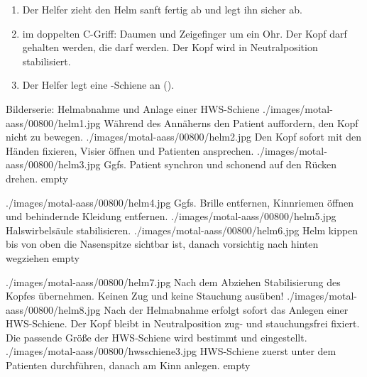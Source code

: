 \begin{ProcedureStepsNoHeading}
{\begin{enumerate}
    {\color{HelferB}Während der Helm abgezogen wird,
    rutscht der  Helfer mit seiner Haltehand
    etwas nach.}
    \item {\color{HelferA}Der  Helfer zieht den
    Helm sanft fertig ab und legt ihn sicher ab.}
    \item {\color{HelferA} im doppelten C-Griff: Daumen und
    Zeigefinger um ein Ohr. Der Kopf darf
     gehalten werden, die 
    darf  werden.
    Der Kopf wird in
    Neutralposition
    stabilisiert. \cite{ITLSde6,AsboeLehrmeinungRd2011-07}
    }
    \item {\color{HelferB}Der  Helfer legt
    eine -Schiene an
    ().}
\end{enumerate}
}{}{}{}{}
\end{ProcedureStepsNoHeading}


\begin{PictureSeriesWide}{}{Bilderserie: Helmabnahme und Anlage
einer HWS-Schiene \label{fig:helmabnahme-hws-schiene}\label{fig:hws-schiene-anlegen}}
{./images/motal-aass/00800/helm1.jpg}%
{Während des Annäherns den Patient auffordern, den Kopf nicht zu bewegen.}
{./images/motal-aass/00800/helm2.jpg}%
{Den Kopf sofort mit den Händen fixieren, Visier öffnen und Patienten ansprechen.}
{./images/motal-aass/00800/helm3.jpg}%
{Ggfs. Patient synchron und schonend auf den Rücken drehen.}
{empty}%
{}

{./images/motal-aass/00800/helm4.jpg}%
{Ggfs. Brille entfernen, Kinnriemen öffnen und behindernde
Kleidung entfernen.}
{./images/motal-aass/00800/helm5.jpg}%
{Halswirbelsäule stabilisieren.}
{./images/motal-aass/00800/helm6.jpg}%
{Helm kippen bis von oben die Nasenspitze sichtbar ist,
danach vorsichtig nach hinten wegziehen}
{empty}%
{}

{./images/motal-aass/00800/helm7.jpg}%
{Nach dem Abziehen Stabilisierung des Kopfes übernehmen. Keinen Zug und keine Stauchung ausüben!}
{./images/motal-aass/00800/helm8.jpg}%
{Nach der Helmabnahme erfolgt sofort das Anlegen einer
HWS-Schiene. Der Kopf bleibt in Neutralposition zug- und
stauchungsfrei fixiert. Die passende Größe der HWS-Schiene
wird bestimmt und eingestellt.}
{./images/motal-aass/00800/hwsschiene3.jpg}%
{HWS-Schiene zuerst unter dem Patienten durchführen, danach
am Kinn anlegen.}
{empty}%
{}
\end{PictureSeriesWide}





